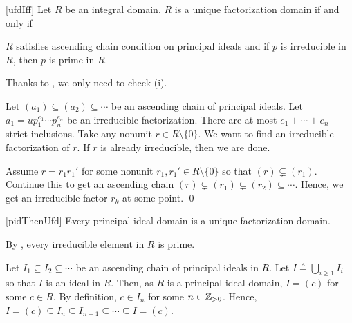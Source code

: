 \documentclass[../modern_algebra_2.tex]{subfiles}
\begin{document}
\begin{Theorem}{}[ufdIff]
    Let \(R\) be an integral domain.
    \(R\) is a unique factorization domain if and only if
    \begin{enumerate}[label=(\roman*)]
        \ii \(R\) satisfies ascending chain condition on principal ideals and
        \ii if \(p\) is irreducible in \(R\), then \(p\) is prime in \(R\).
    \end{enumerate}
\end{Theorem}
\begin{myclaim}[Proof]\hfill
\begin{pftfae}[labelwidth=\widthof{(\(\Rightarrow\))}]
    \ii[(\(\Rightarrow\))]
    Thanks to , we only need to check (i).

    Let \((a_1) \subseteq (a_2) \subseteq \cdots\) be an ascending chain of principal ideals.
    Let \(a_1 = u p_1^{e_1} \cdots p_n^{e_n}\) be an irreducible factorization.
    There are at most \(e_1 + \cdots + e_n\) strict inclusions.
    \ii[(\(\Leftarrow\))]
    Take any nonunit \(r \in R \setminus \{0\}\).
    We want to find an irreducible factorization of \(r\).
    If \(r\) is already irreducible, then we are done.

    Assume \(r = r_1 r_1'\) for some nonunit \(r_1, r_1' \in R \setminus \{0\}\)
    so that \((r) \subsetneq (r_1)\).
    Continue this to get an ascending chain \((r) \subsetneq (r_1) \subsetneq (r_2) \subseteq \cdots\).
    Hence, we get an irreducible factor \(r_k\) at some point.
    \qed
\end{pftfae}
\end{myclaim}

\begin{Corollary}{}[pidThenUfd]
    Every principal ideal domain is a unique factorization domain.
\end{Corollary}
\begin{myproof}[Proof]
    By , every irreducible element in \(R\) is prime.

    Let \(I_1 \subseteq I_2 \subseteq \cdots\) be an ascending chain of principal ideals in \(R\).
    Let \(I \triangleq \bigcup_{i \ge 1} I_i\) so that \(I\) is an ideal in \(R\).
    Then, as \(R\) is a principal ideal domain, \(I = (c)\) for some \(c \in R\).
    By definition, \(c \in I_n\) for some \(n \in \ZZ_{>0}\).
    Hence, \(I = (c) \subseteq I_n \subseteq I_{n+1} \subseteq \cdots \subseteq I = (c)\).
\end{myproof}
\end{document}
